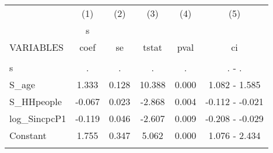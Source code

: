 \documentclass[]{article}
\begin{document}
\begin{tabular}{lccccc} \hline
 & (1) & (2) & (3) & (4) & (5) \\
 & s &  &  &  &  \\
VARIABLES & coef & se & tstat & pval & ci \\ \hline
 &  &  &  &  &  \\
s & . & . & . & . & . - . \\
S\_age & 1.333 & 0.128 & 10.388 & 0.000 & 1.082 - 1.585 \\
S\_HHpeople & -0.067 & 0.023 & -2.868 & 0.004 & -0.112 - -0.021 \\
log\_SincpcP1 & -0.119 & 0.046 & -2.607 & 0.009 & -0.208 - -0.029 \\
Constant & 1.755 & 0.347 & 5.062 & 0.000 & 1.076 - 2.434 \\
 &  &  &  &  &  \\ \hline
\end{tabular}
\end{document}
